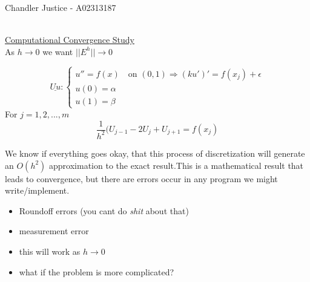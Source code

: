 \documentclass[10pt]{article}
\newcommand{\1}{\mathbb{1}}
\begin{document}
\begin{flushright}
Chandler Justice - A02313187
\end{flushright}
\noindent \underline{\hspace{3in}}\\

\underline{Computational Convergence Study}\\

As $h \to 0$ we want $||E^h|| \to 0$

\[\underline{Uu}:
\begin{cases} 
u'' = f(x) \quad \text{on } (0,1) \Rightarrow (ku')' = f(x_j) + \epsilon\\
u(0) = \alpha\\
u(1) = \beta
\end{cases}\]
For $j = 1,2,...,m$
\[\frac{1}{h^2} (U_{j-1} - 2U_j + U_{j+1} = f(x_j)\]

We know if everything goes okay, that this process of discretization will generate an $O(h^2)$ approximation to the exact result.This is a mathematical result that leads to convergence, but there are errors occur in any program we might write/implement.\\
\begin{itemize}
    \item Roundoff errors (you cant do \textit{shit} about that)
    \item measurement error
    \item this will work as $h \to 0$
    \item what if the problem is more complicated?
    \end{itemize}
\end{document}
